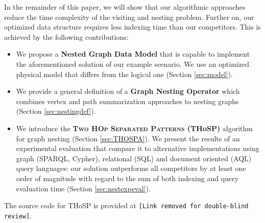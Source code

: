 

In the remainder of this paper, we will show that our algorithmic approaches reduce the time complexity of the visiting and nesting problem. Further on, our optimized data structure requires less indexing time than our competitors. This is achieved by the following contributions:

\begin{itemize}
	\item We propose a \textbf{Nested Graph Data Model} that is capable to implement the aforementioned solution of our example scenario. We use an optimized physical model that differs from the logical one (Section \ref{sec:model}).

	\item We provide  a general definition of a \textbf{Graph Nesting Operator} which combines vertex and path summarization approaches to nesting graphs (Section \ref{sec:nestingdef}).
	\item We introduce the  \textbf{\textsc{{Two HOp Separated Patterns}} (THoSP)} algorithm for graph nesting (Section \ref{sec:THOSPA}). We present the results of an experimental evaluation that compare it to alternative implementations using graph (SPARQL, Cypher), relational (SQL) and document oriented (AQL) query languages: our solution outperforms all competitors by at least one order of magnitude with regard to the sum of both indexing and query evaluation time (Section \ref{sec:nestexpeval}).

\end{itemize}

The source code for THoSP is provided at \texttt{\color{red}[Link removed for double-blind review]}.
